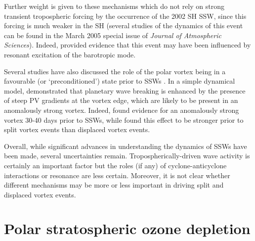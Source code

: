 Further weight is given to these mechanisms which do not rely on strong
transient tropospheric forcing by the occurrence of the 2002 SH SSW, since this
forcing is much weaker in the SH (several studies of the dynamics of this event
can be found in the March 2005 special issue of \emph{Journal of Atmospheric
  Sciences}). Indeed, \citet{Esler2006} provided evidence that this event may
have been influenced by resonant excitation of the barotropic mode.


Several studies have also discussed the role of the polar vortex being in a
favourable (or `preconditioned') state prior to SSWs
\citep[e.g.,][]{McIntyre1982}. In a simple dynamical model, \citet{Scott2004}
demonstrated that planetary wave breaking is enhanced by the presence of steep
PV gradients at the vortex edge, which are likely to be present in an
anomalously strong vortex. Indeed, \citet{Limpasuvan2004} found evidence for an
anomalously strong vortex 30-40 days prior to SSWs, while \citet{Charlton2007}
found this effect to be stronger prior to split vortex events than displaced
vortex events. 

Overall, while significant advances in understanding the dynamics of SSWs have
been made, several uncertainties remain. Tropospherically-driven wave activity
is certainly an important factor but the roles (if any) of cyclone-anticyclone
interactions or resonance are less certain. Moreover, it is not clear whether
different mechanisms may be more or less important in driving split and
displaced vortex events.


\section{Polar stratospheric ozone depletion}
\label{sec:polar-strat-ozone}

